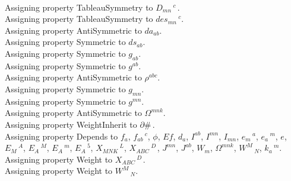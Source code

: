 \documentclass[11pt]{article}
\begin{document}
\\
Assigning property TableauSymmetry to ${D}_{m n}\,^{c}\, $.
\\
Assigning property TableauSymmetry to ${des}_{m n}\,^{c}$.
\\
Assigning property AntiSymmetric to ${da}_{a b}$.
\\
Assigning property Symmetric to ${ds}_{a b}$.
\\
Assigning property Symmetric to ${g}_{a b}$.
\\
Assigning property Symmetric to ${g}^{a b}$.
\\
Assigning property AntiSymmetric to ${\rho}^{a b c}$.
\\
Assigning property Symmetric to ${g}_{m n}$.
\\
Assigning property Symmetric to ${g}^{m n}$.
\\
Assigning property AntiSymmetric to ${\Omega}^{m n k}$.
\\
Assigning property WeightInherit to $\partial{\#}\, $.
\\
Assigning property Depends to ${f}_{a}$, ${f}_{a b}\,^{c}$, $\phi$, $Ef$, ${d}_{a}$, ${I}^{a b}$, ${I}^{m n}$, ${I}_{m n}$, ${e}_{m}\,^{a}$, ${e}_{a}\,^{m}$, $e$, ${E}_{M}\,^{A}$, ${E}_{A}\,^{M}$, ${E}_{A}\,^{m}$, ${E}_{A}\,^{5}$, ${X}_{M N K}\,^{L}$, ${X}_{A B C}\,^{D\, }$, ${J}^{m n}$, ${J}^{a b}$, ${W}_{m}$, ${\Omega}^{m n k}$, ${W}^{M}\,_{N}$, ${k}_{a}\,^{m}$.
\\
Assigning property Weight to ${X}_{A B C}\,^{D\, }$.
\\
Assigning property Weight to ${W}^{M}\,_{N}$.
\\
\end{document}
